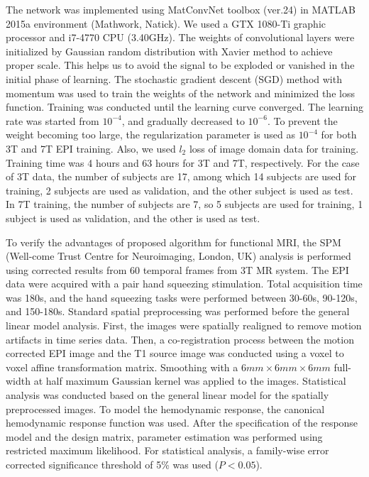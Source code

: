 \documentclass[num-refs]{wiley-article}
\newcommand{\0}{{\boldsymbol{0}}}
\newcommand{\1}{\blmath{1}}
\begin{document}
	The network was implemented using MatConvNet toolbox (ver.24) in MATLAB 2015a environment (Mathwork, Natick). We used a GTX 1080-Ti graphic processor and i7-4770 CPU (3.40GHz). The weights of convolutional layers were initialized by Gaussian random distribution with Xavier method to achieve proper scale. This helps us to avoid the signal to be exploded or vanished in the initial phase of learning. The stochastic gradient descent (SGD) method with momentum was used to train the weights of the network and minimized the loss function. Training was conducted until the learning curve converged. The learning rate was started from $10^{-4}$, and gradually decreased to $10^{-6}$. To prevent the weight becoming too large, the regularization parameter is used as $10^{-4}$ for both 3T and 7T EPI training. Also, we used $l_2$ loss of image domain data for training. Training time was 4 hours and 63 hours for 3T and 7T, respectively. For the case of 3T data,
	the number of subjects are 17, among which 14 subjects are used for training, 2 subjects are used as validation, and the other subject is used as test. In 7T training, the number of subjects are 7, so 5 subjects are used for training, 1 subject is used as validation, and the other is used as test.
	
	
	To verify the advantages of proposed algorithm for functional MRI, the SPM (Well-come Trust Centre for Neuroimaging, London, UK) analysis is performed using corrected results from 60 temporal frames from 3T MR system. The EPI data were acquired with a pair hand squeezing stimulation. Total acquisition time was 180s, and the hand squeezing tasks were performed between 30-60s, 90-120s, and 150-180s. 
	Standard spatial preprocessing was performed before the general linear model analysis. First, the images were spatially realigned to remove motion artifacts in time series data. Then, a co-registration process between the motion corrected EPI image and the T1 source image was conducted using a voxel to voxel affine transformation matrix. Smoothing with a $6mm \times 6mm \times 6mm$ full-width at half maximum Gaussian kernel was applied to the images. Statistical analysis was conducted based on the general linear model for the spatially preprocessed images. To model the hemodynamic response, the canonical hemodynamic response function was used. After the specification of the response model and the design matrix, parameter estimation was performed using restricted maximum likelihood. For statistical analysis, a family-wise error corrected significance threshold of 5\% was used ($P < 0.05$).
	
\end{document}
